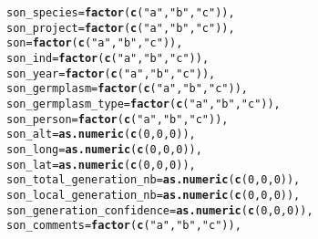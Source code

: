 \documentclass{article}\usepackage[]{graphicx}\usepackage[]{color}
\makeatletter
\newcommand{\hlnum}[1]{\textcolor[rgb]{0.686,0.059,0.569}{#1}}%
\newcommand{\hlstr}[1]{\textcolor[rgb]{0.192,0.494,0.8}{#1}}%
\newcommand{\hlstd}[1]{\textcolor[rgb]{0.345,0.345,0.345}{#1}}%
\newcommand{\hlkwc}[1]{\textcolor[rgb]{0.333,0.667,0.333}{#1}}%
\newcommand{\hlkwd}[1]{\textcolor[rgb]{0.737,0.353,0.396}{\textbf{#1}}}%
\newenvironment{kframe}{%
 \def\at@end@of@kframe{}%
 \ifinner\ifhmode%
  \def\at@end@of@kframe{\end{minipage}}%
  \begin{minipage}{\columnwidth}%
 \fi\fi%
 \def\FrameCommand##1{\hskip\@totalleftmargin \hskip-\fboxsep
 \colorbox{shadecolor}{##1}\hskip-\fboxsep
     \hskip-\linewidth \hskip-\@totalleftmargin \hskip\columnwidth}%
 \MakeFramed {\advance\hsize-\width
   \@totalleftmargin\z@ \linewidth\hsize
   \@setminipage}}%
 {\par\unskip\endMakeFramed%
 \at@end@of@kframe}
\newenvironment{knitrout}{}{} %
\makeatother
\begin{document}
\begin{appendices}
\begin{knitrout}
\begin{kframe}
\begin{alltt}
        \hlkwc{son_species} \hlstd{=} \hlkwd{factor}\hlstd{(}\hlkwd{c}\hlstd{(}\hlstr{"a"}\hlstd{,} \hlstr{"b"}\hlstd{,} \hlstr{"c"}\hlstd{)),}
        \hlkwc{son_project} \hlstd{=} \hlkwd{factor}\hlstd{(}\hlkwd{c}\hlstd{(}\hlstr{"a"}\hlstd{,} \hlstr{"b"}\hlstd{,} \hlstr{"c"}\hlstd{)),}
        \hlkwc{son} \hlstd{=} \hlkwd{factor}\hlstd{(}\hlkwd{c}\hlstd{(}\hlstr{"a"}\hlstd{,} \hlstr{"b"}\hlstd{,} \hlstr{"c"}\hlstd{)),}
        \hlkwc{son_ind} \hlstd{=} \hlkwd{factor}\hlstd{(}\hlkwd{c}\hlstd{(}\hlstr{"a"}\hlstd{,} \hlstr{"b"}\hlstd{,} \hlstr{"c"}\hlstd{)),}
        \hlkwc{son_year} \hlstd{=} \hlkwd{factor}\hlstd{(}\hlkwd{c}\hlstd{(}\hlstr{"a"}\hlstd{,} \hlstr{"b"}\hlstd{,} \hlstr{"c"}\hlstd{)),}
        \hlkwc{son_germplasm} \hlstd{=} \hlkwd{factor}\hlstd{(}\hlkwd{c}\hlstd{(}\hlstr{"a"}\hlstd{,} \hlstr{"b"}\hlstd{,} \hlstr{"c"}\hlstd{)),}
        \hlkwc{son_germplasm_type} \hlstd{=} \hlkwd{factor}\hlstd{(}\hlkwd{c}\hlstd{(}\hlstr{"a"}\hlstd{,} \hlstr{"b"}\hlstd{,} \hlstr{"c"}\hlstd{)),}
        \hlkwc{son_person} \hlstd{=} \hlkwd{factor}\hlstd{(}\hlkwd{c}\hlstd{(}\hlstr{"a"}\hlstd{,} \hlstr{"b"}\hlstd{,} \hlstr{"c"}\hlstd{)),}
        \hlkwc{son_alt} \hlstd{=} \hlkwd{as.numeric}\hlstd{(}\hlkwd{c}\hlstd{(}\hlnum{0}\hlstd{,} \hlnum{0}\hlstd{,} \hlnum{0}\hlstd{)),}
        \hlkwc{son_long} \hlstd{=} \hlkwd{as.numeric}\hlstd{(}\hlkwd{c}\hlstd{(}\hlnum{0}\hlstd{,} \hlnum{0}\hlstd{,} \hlnum{0}\hlstd{)),}
        \hlkwc{son_lat} \hlstd{=} \hlkwd{as.numeric}\hlstd{(}\hlkwd{c}\hlstd{(}\hlnum{0}\hlstd{,} \hlnum{0}\hlstd{,} \hlnum{0}\hlstd{)),}
        \hlkwc{son_total_generation_nb} \hlstd{=} \hlkwd{as.numeric}\hlstd{(}\hlkwd{c}\hlstd{(}\hlnum{0}\hlstd{,} \hlnum{0}\hlstd{,} \hlnum{0}\hlstd{)),}
        \hlkwc{son_local_generation_nb} \hlstd{=} \hlkwd{as.numeric}\hlstd{(}\hlkwd{c}\hlstd{(}\hlnum{0}\hlstd{,} \hlnum{0}\hlstd{,} \hlnum{0}\hlstd{)),}
        \hlkwc{son_generation_confidence} \hlstd{=} \hlkwd{as.numeric}\hlstd{(}\hlkwd{c}\hlstd{(}\hlnum{0}\hlstd{,} \hlnum{0}\hlstd{,} \hlnum{0}\hlstd{)),}
        \hlkwc{son_comments} \hlstd{=} \hlkwd{factor}\hlstd{(}\hlkwd{c}\hlstd{(}\hlstr{"a"}\hlstd{,} \hlstr{"b"}\hlstd{,} \hlstr{"c"}\hlstd{)),}


\end{alltt}
\end{kframe}
\end{knitrout}
\end{appendices}
\end{document}
